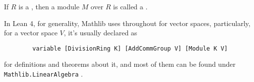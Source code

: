 \begin{definition}
    \label{vector_space}
    \leanok

    If $R$ is a , then a module $M$ over $R$ is called a .

\end{definition}

\begin{remark}
    \label{mk:vector_space}

    In Lean 4, for generality, Mathlib uses  throughout for vector spaces,
    particularly, for a vector space $V$, it's usually declared as

    \begin{lstlisting}
        variable [DivisionRing K] [AddCommGroup V] [Module K V]
    \end{lstlisting}

    for definitions and theorems about it, and most of them can be found under \texttt{Mathlib.LinearAlgebra} .
    
\end{remark}